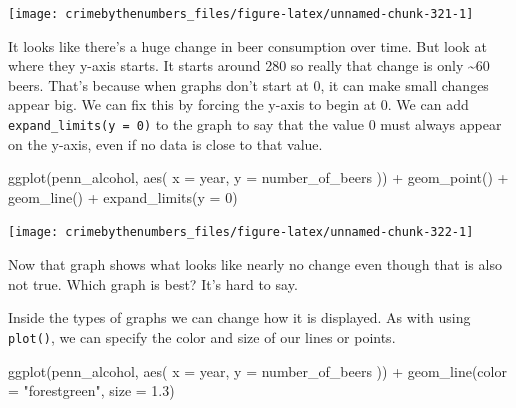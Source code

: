 \documentclass[
  a4paper,
]{krantz}
\makeatletter
\newenvironment{Shaded}{\begin{snugshade}}{\end{snugshade}}
\newcommand{\AttributeTok}[1]{\textcolor[rgb]{0.61,0.61,0.61}{#1}}
\newcommand{\DecValTok}[1]{\textcolor[rgb]{0.06,0.06,0.06}{#1}}
\newcommand{\FloatTok}[1]{\textcolor[rgb]{0.06,0.06,0.06}{#1}}
\newcommand{\FunctionTok}[1]{\textcolor[rgb]{0,0,0}{#1}}
\newcommand{\NormalTok}[1]{#1}
\newcommand{\SpecialCharTok}[1]{\textcolor[rgb]{0,0,0}{#1}}
\newcommand{\StringTok}[1]{\textcolor[rgb]{0.5,0.5,0.5}{#1}}
\newenvironment{kframe}{%
\medskip{}
\setlength{\fboxsep}{.8em}
 \def\at@end@of@kframe{}%
 \ifinner\ifhmode%
  \def\at@end@of@kframe{\end{minipage}}%
  \begin{minipage}{\columnwidth}%
 \fi\fi%
 \def\FrameCommand##1{\hskip\@totalleftmargin \hskip-\fboxsep
 \colorbox{shadecolor}{##1}\hskip-\fboxsep
     \hskip-\linewidth \hskip-\@totalleftmargin \hskip\columnwidth}%
 \MakeFramed {\advance\hsize-\width
   \@totalleftmargin\z@ \linewidth\hsize
   \@setminipage}}%
 {\par\unskip\endMakeFramed%
 \at@end@of@kframe}
\renewenvironment{Shaded}{\begin{kframe}}{\end{kframe}}
\makeatother
\begin{document}
\begin{center}\texttt{[image: crimebythenumbers\_files/figure-latex/unnamed-chunk-321-1]} \end{center}

It looks like there's a huge change in beer consumption over
time. But look at where they y-axis starts. It starts around
280 so really that change is only \textasciitilde60 beers.
That's because when graphs don't start at 0, it can make
small changes appear big. We can fix this by forcing the
y-axis to begin at 0. We can add
\texttt{expand\_limits(y\ =\ 0)} to the graph to say that
the value 0 must always appear on the y-axis, even if no
data is close to that value.

\begin{Shaded}
\begin{Highlighting}[]
\FunctionTok{ggplot}\NormalTok{(penn\_alcohol, }\FunctionTok{aes}\NormalTok{(}
  \AttributeTok{x =}\NormalTok{ year,}
  \AttributeTok{y =}\NormalTok{ number\_of\_beers}
\NormalTok{)) }\SpecialCharTok{+}
  \FunctionTok{geom\_point}\NormalTok{() }\SpecialCharTok{+}
  \FunctionTok{geom\_line}\NormalTok{() }\SpecialCharTok{+}
  \FunctionTok{expand\_limits}\NormalTok{(}\AttributeTok{y =} \DecValTok{0}\NormalTok{)}
\end{Highlighting}
\end{Shaded}

\begin{center}\texttt{[image: crimebythenumbers\_files/figure-latex/unnamed-chunk-322-1]} \end{center}

Now that graph shows what looks like nearly no change even
though that is also not true. Which graph is best? It's hard
to say.

Inside the types of graphs we can change how it is
displayed. As with using \texttt{plot()}, we can specify the
color and size of our lines or points.

\begin{Shaded}
\begin{Highlighting}[]
\FunctionTok{ggplot}\NormalTok{(penn\_alcohol, }\FunctionTok{aes}\NormalTok{(}
  \AttributeTok{x =}\NormalTok{ year,}
  \AttributeTok{y =}\NormalTok{ number\_of\_beers}
\NormalTok{)) }\SpecialCharTok{+}
  \FunctionTok{geom\_line}\NormalTok{(}\AttributeTok{color =} \StringTok{"forestgreen"}\NormalTok{, }\AttributeTok{size =} \FloatTok{1.3}\NormalTok{)}
\end{Highlighting}
\end{Shaded}
\end{document}
